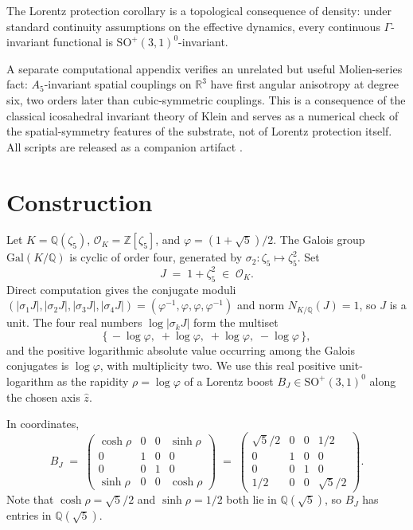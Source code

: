 \documentclass[11pt]{article}
\theoremstyle{remark}
\begin{document}
The Lorentz protection corollary is a topological consequence of
density: under standard continuity assumptions on the effective
dynamics, every continuous $\Gamma$-invariant functional is
$\mathrm{SO}^+(3,1)^0$-invariant.

A separate computational appendix verifies an unrelated but
useful Molien-series fact: $A_5$-invariant spatial couplings on
$\mathbb{R}^3$ have first angular anisotropy at degree six, two orders
later than cubic-symmetric couplings. This is a consequence of the
classical icosahedral invariant theory of Klein \cite{Klein1884} and
serves as a numerical check of the spatial-symmetry features of the
substrate, not of Lorentz protection itself. All scripts are released
as a companion artifact \cite{ALPCode}.


\section{Construction}

Let $K = \mathbb{Q}(\zeta_5)$, $\mathcal{O}_K = \mathbb{Z}[\zeta_5]$,
and $\varphi = (1+\sqrt{5})/2$. The Galois group
$\mathrm{Gal}(K/\mathbb{Q})$ is cyclic of order four, generated by
$\sigma_2: \zeta_5 \mapsto \zeta_5^2$. Set
\[
  J \;=\; 1 + \zeta_5^2 \;\in\; \mathcal{O}_K.
\]
Direct computation gives the conjugate moduli
$(|\sigma_1 J|, |\sigma_2 J|, |\sigma_3 J|, |\sigma_4 J|) =
(\varphi^{-1}, \varphi, \varphi, \varphi^{-1})$ and norm
$N_{K/\mathbb{Q}}(J) = 1$, so $J$ is a unit. The four real numbers
$\log|\sigma_k J|$ form the multiset
\[
  \bigl\{\, -\log\varphi,\; +\log\varphi,\; +\log\varphi,\;
    -\log\varphi \,\bigr\},
\]
and the positive logarithmic absolute value occurring among the
Galois conjugates is $\log\varphi$, with multiplicity two. We use this real positive
unit-logarithm as the rapidity $\rho = \log\varphi$ of a Lorentz
boost $B_J \in \mathrm{SO}^+(3,1)^0$ along the chosen axis $\hat{z}$.

In coordinates,
\[
  B_J \;=\;
  \begin{pmatrix}
    \cosh\rho & 0 & 0 & \sinh\rho \\
    0 & 1 & 0 & 0 \\
    0 & 0 & 1 & 0 \\
    \sinh\rho & 0 & 0 & \cosh\rho
  \end{pmatrix}
  \;=\;
  \begin{pmatrix}
    \sqrt{5}/2 & 0 & 0 & 1/2 \\
    0 & 1 & 0 & 0 \\
    0 & 0 & 1 & 0 \\
    1/2 & 0 & 0 & \sqrt{5}/2
  \end{pmatrix}.
\]
Note that $\cosh\rho = \sqrt{5}/2$ and $\sinh\rho = 1/2$ both lie in
$\mathbb{Q}(\sqrt{5})$, so $B_J$ has entries in $\mathbb{Q}(\sqrt{5})$.
\end{document}

